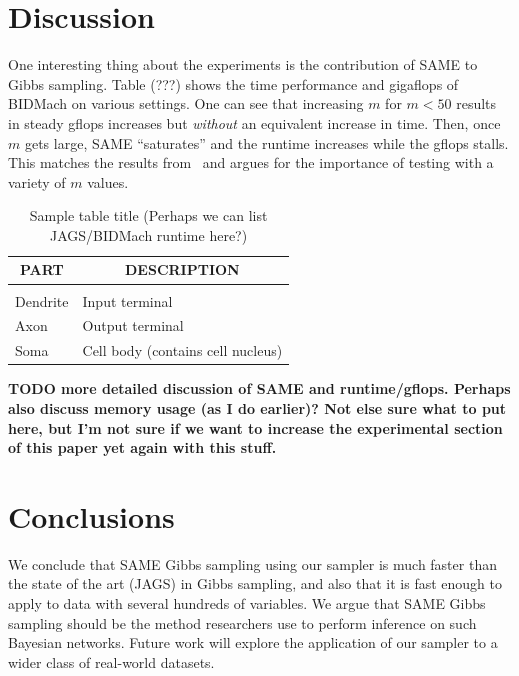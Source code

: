 \documentclass{article} %
\begin{document}
\section{Discussion}\label{sec:discussion}

One interesting thing about the experiments is the contribution of SAME to Gibbs sampling.  Table
(???) shows the time performance and gigaflops of BIDMach on various settings. One can see that
increasing $m$ for $m < 50$ results in steady gflops increases but \emph{without} an equivalent
increase in time. Then, once $m$ gets large, SAME ``saturates'' and the runtime increases while the
gflops stalls. This matches the results from~\citep{SAME2015} and argues for the importance of
testing with a variety of $m$ values.

\begin{table}[t]
\caption{Sample table title (Perhaps we can list JAGS/BIDMach runtime here?)}
\label{sample-table}
\begin{center}
\begin{tabular}{ll}
\multicolumn{1}{c}{\bf PART}  &\multicolumn{1}{c}{\bf DESCRIPTION}
\\ \hline \\
Dendrite         &Input terminal \\
Axon             &Output terminal \\
Soma             &Cell body (contains cell nucleus) \\
\end{tabular}
\end{center}
\end{table}

\textbf{TODO more detailed discussion of SAME and runtime/gflops. Perhaps also discuss memory usage
(as I do earlier)? Not else sure what to put here, but I'm not sure if we want to increase the
experimental section of this paper yet again with this stuff.}

\section{Conclusions}\label{sec:conclusions}

We conclude that SAME Gibbs sampling using our sampler is much faster than the state of the
art (JAGS) in Gibbs sampling, and also that it is fast enough to apply to data with several hundreds
of variables. We argue that SAME Gibbs sampling should be the method researchers use to perform
inference on such Bayesian networks. Future work will explore the application of our sampler to a
wider class of real-world datasets.
\end{document}
